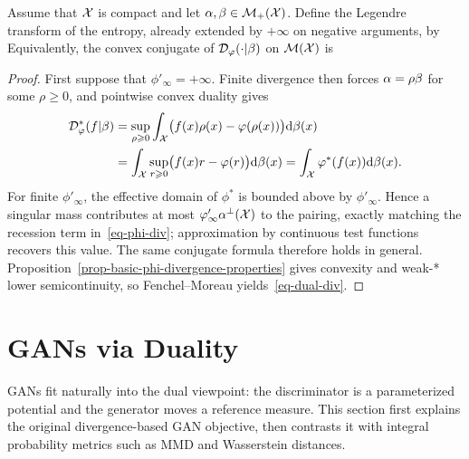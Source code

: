 \begin{proposition}\label{prop-phi-div-dual}
	Assume that $\mathcal{X}$ is compact and let $\alpha,\beta\in\mathcal{M}_+(\mathcal{X})$. Define the Legendre transform of the entropy, already extended by $+\infty$ on negative arguments, by
	Equivalently, the convex conjugate of $\mathcal{D}_\varphi(\cdot|\beta)$ on $\mathcal{M}(\mathcal{X})$ is
\end{proposition}

\begin{proof}
	First suppose that $\phi'_\infty=+\infty$. Finite divergence then forces $\alpha=\rho\beta$ for some $\rho\geq0$, and pointwise convex duality gives
	\begin{align*}
		\mathcal{D}_\varphi^*(f|\beta)
		&= \sup_{\rho\geqslant0}
		\int_{\mathcal{X}} \bigl(f(x)\rho(x)-\varphi(\rho(x))\bigr)\mathrm{d}\beta(x)\\
		&= \int_{\mathcal{X}} \sup_{r\geqslant0}\bigl(f(x)r-\varphi(r)\bigr)\mathrm{d}\beta(x)
		= \int_{\mathcal{X}} \varphi^*(f(x))\mathrm{d}\beta(x).
	\end{align*}
	For finite $\phi'_\infty$, the effective domain of $\phi^*$ is bounded above by $\phi'_\infty$. Hence a singular mass contributes at most $\varphi'_\infty\alpha^\perp(\mathcal{X})$ to the pairing, exactly matching the recession term in~\eqref{eq-phi-div}; approximation by continuous test functions recovers this value. The same conjugate formula therefore holds in general. Proposition~\ref{prop-basic-phi-divergence-properties} gives convexity and weak-* lower semicontinuity, so Fenchel--Moreau yields~\eqref{eq-dual-div}.
\end{proof}


\section{GANs via Duality}
\label{sec-gan-duality}


GANs fit naturally into the dual viewpoint: the discriminator is a parameterized potential and the generator moves a reference measure. This section first explains the original divergence-based GAN objective, then contrasts it with integral probability metrics such as MMD and Wasserstein distances.

